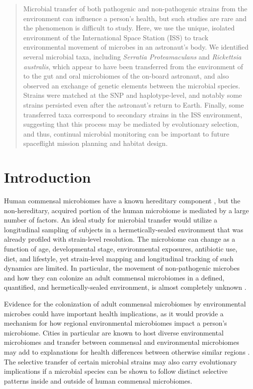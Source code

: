 \begin{abstract}

Microbial transfer of both pathogenic and non-pathogenic strains from the environment can influence a person's health, but such studies are rare and the phenomenon is difficult to study. Here, we use the unique, isolated environment of the International Space Station (ISS) to track environmental movement of microbes in an astronaut's body. We identified several microbial taxa, including \textit{Serratia Proteamaculans} and \textit{Rickettsia australis}, which appear to have been transferred from the environment of to the gut and oral microbiomes of the on-board astronaut, and also observed an exchange of genetic elements between the microbial species. Strains were matched at the SNP and haplotype-level, and notably some strains persisted even after the astronaut's return to Earth. Finally, some transferred taxa correspond to secondary strains in the ISS environment, suggesting that this process may be mediated by evolutionary selection, and thus, continual microbial monitoring can be important to future spaceflight mission planning and habitat design.


\end{abstract}

\section{Introduction}

Human commensal microbiomes have a known hereditary component \citep{Goodrich2016}, but the non-hereditary, acquired portion of the human microbiome is mediated by a large number of factors. An ideal study for microbial transfer would utilize a longitudinal sampling of subjects in a hermetically-sealed environment that was already profiled with strain-level resolution. The microbiome can  change as a function of age, developmental stage, environmental exposures, antibiotic use, diet, and lifestyle, yet strain-level mapping and longitudinal tracking of such dynamics are limited. In particular,  the movement of non-pathogenic microbes and how they can colonize an adult commensal microbiomes in a defined, quantified, and hermetically-sealed environment, is almost completely unknown \citep{Schwendner2017}.

Evidence for the colonization of adult commensal microbiomes by environmental microbes could have important health implications, as it would provide a mechanism for how regional environmental microbiomes impact a person's microbiome. Cities in particular are known to host diverse environmental microbiomes \citep{danko2019global} and transfer between commensal and environmental microbiomes may add to explanations for health differences between otherwise similar regions \citep{Nicolaou2005}. The selective transfer of certain microbial strains may also carry evolutionary implications if a microbial species can be shown to follow distinct selective patterns inside and outside of human commensal microbiomes. 

